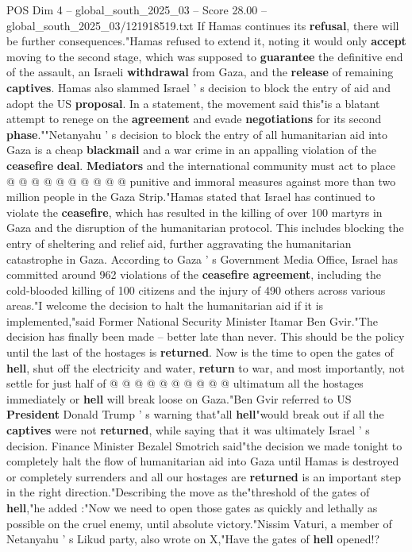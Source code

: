 \begin{textsample}{POS Dim 4 – global\_south\_2025\_03 – Score 28.00 – global\_south\_2025\_03/121918519.txt}
If Hamas continues its \textbf{refusal}, there will be further consequences."Hamas refused to extend it, noting it would only \textbf{accept} moving to the second stage, which was supposed to \textbf{guarantee} the definitive end of the assault, an Israeli \textbf{withdrawal} from Gaza, and the \textbf{release} of remaining \textbf{captives}.
Hamas also slammed Israel ' s decision to block the entry of aid and adopt the US \textbf{proposal}.
In a statement, the movement said this"is a blatant attempt to renege on the \textbf{agreement} and evade \textbf{negotiations} for its second \textbf{phase}.""Netanyahu ' s decision to block the entry of all humanitarian aid into Gaza is a cheap \textbf{blackmail} and a war crime in an appalling violation of the \textbf{ceasefire} \textbf{deal}. \textbf{Mediators} and the international community must act to place @ @ @ @ @ @ @ @ @ @ punitive and immoral measures against more than two million people in the Gaza Strip."Hamas stated that Israel has continued to violate the \textbf{ceasefire}, which has resulted in the killing of over 100 martyrs in Gaza and the disruption of the humanitarian protocol.
This includes blocking the entry of sheltering and relief aid, further aggravating the humanitarian catastrophe in Gaza.
According to Gaza ' s Government Media Office, Israel has committed around 962 violations of the \textbf{ceasefire} \textbf{agreement}, including the cold-blooded killing of 100 citizens and the injury of 490 others across various areas."I welcome the decision to halt the humanitarian aid if it is implemented,"said Former National Security Minister Itamar Ben Gvir."The decision has finally been made -- better late than never.
This should be the policy until the last of the hostages is \textbf{returned}.
Now is the time to open the gates of \textbf{hell}, shut off the electricity and water, \textbf{return} to war, and most importantly, not settle for just half of @ @ @ @ @ @ @ @ @ @ ultimatum all the hostages immediately or \textbf{hell} will break loose on Gaza."Ben Gvir referred to US \textbf{President} Donald Trump ' s warning that"all \textbf{hell}"would break out if all the \textbf{captives} were not \textbf{returned}, while saying that it was ultimately Israel ' s decision.
Finance Minister Bezalel Smotrich said"the decision we made tonight to completely halt the flow of humanitarian aid into Gaza until Hamas is destroyed or completely surrenders and all our hostages are \textbf{returned} is an important step in the right direction."Describing the move as the"threshold of the gates of \textbf{hell},"he added :"Now we need to open those gates as quickly and lethally as possible on the cruel enemy, until absolute victory."Nissim Vaturi, a member of Netanyahu ' s Likud party, also wrote on X,"Have the gates of \textbf{hell} opened!?

\end{textsample}
